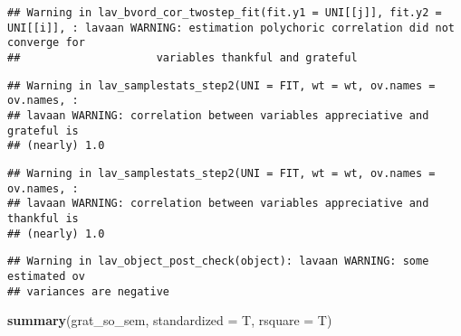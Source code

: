 \documentclass[
]{article}
\newenvironment{Shaded}{\begin{snugshade}}{\end{snugshade}}
\newcommand{\AttributeTok}[1]{\textcolor[rgb]{0.13,0.29,0.53}{#1}}
\newcommand{\FunctionTok}[1]{\textcolor[rgb]{0.13,0.29,0.53}{\textbf{#1}}}
\newcommand{\NormalTok}[1]{#1}
\begin{document}
\begin{verbatim}
## Warning in lav_bvord_cor_twostep_fit(fit.y1 = UNI[[j]], fit.y2 = UNI[[i]], : lavaan WARNING: estimation polychoric correlation did not converge for
##                     variables thankful and grateful
\end{verbatim}

\begin{verbatim}
## Warning in lav_samplestats_step2(UNI = FIT, wt = wt, ov.names = ov.names, :
## lavaan WARNING: correlation between variables appreciative and grateful is
## (nearly) 1.0
\end{verbatim}

\begin{verbatim}
## Warning in lav_samplestats_step2(UNI = FIT, wt = wt, ov.names = ov.names, :
## lavaan WARNING: correlation between variables appreciative and thankful is
## (nearly) 1.0
\end{verbatim}

\begin{verbatim}
## Warning in lav_object_post_check(object): lavaan WARNING: some estimated ov
## variances are negative
\end{verbatim}

\begin{Shaded}
\begin{Highlighting}[]
\FunctionTok{summary}\NormalTok{(grat\_so\_sem, }\AttributeTok{standardized =}\NormalTok{ T, }\AttributeTok{rsquare =}\NormalTok{ T)}
\end{Highlighting}
\end{Shaded}
\end{document}
